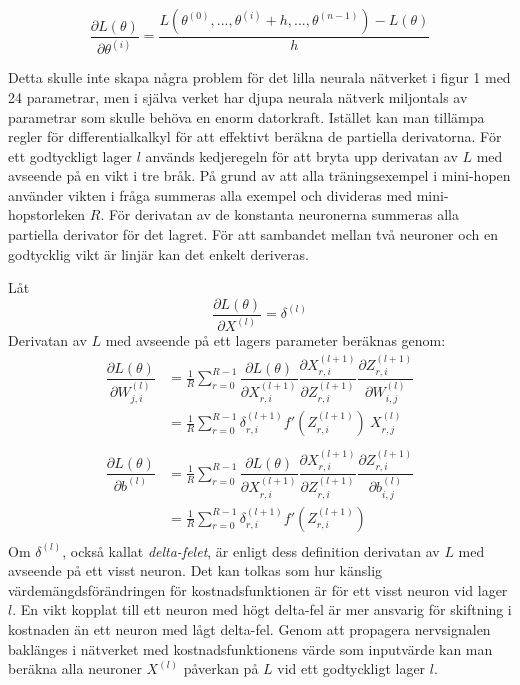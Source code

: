 \documentclass[a4paper,11pt,twoside]{article}
\newcommand*{\pd}[2]{\ensuremath{\dfrac{\partial #1}{\partial #2}}}
\newcommand*{\inpd}[2]{\ensuremath{\frac{\partial #1}{\partial #2}}}
\begin{document}
\begin{equation}
\pd{L(\theta)}{\theta^{(i)}} = \frac{L(\theta^{(0)},...,\theta^{(i)} + h, ..., \theta^{(n-1)})-L(\theta)}{h}
\end{equation}

Detta skulle inte skapa några problem för det lilla neurala nätverket i figur 1 med 24 parametrar, men i själva verket har djupa neurala nätverk miljontals av parametrar som skulle behöva en enorm datorkraft. Istället kan man tillämpa regler för differentialkalkyl för att effektivt beräkna de partiella derivatorna. För ett godtyckligt lager $l$ används kedjeregeln för att bryta upp derivatan av $L$ med avseende på en vikt i tre bråk. På grund av att alla träningsexempel i mini-hopen använder vikten i fråga summeras alla exempel och divideras med mini-hopstorleken $R$. För derivatan av de konstanta neuronerna summeras alla partiella derivator för det lagret. För att sambandet mellan två neuroner och en godtycklig vikt är linjär kan det enkelt deriveras. \cite{cs231n}

Låt
\begin{equation}
\inpd{L(\theta)}{X^{(l)}} = \delta^{(l)}
\end{equation}
Derivatan av $L$ med avseende på ett lagers parameter beräknas genom: \cite{cs231n}
\begin{equation}\label{dLdW_FCC}
\begin{split}
\pd{L(\theta)}{W^{(l)}_{j,i}} 
	& = \frac{1}{R}\sum^{R-1}_{r=0} \pd{L(\theta)}{X^{(l+1)}_{r,i}} \pd{X^{(l+1)}_{r,i}}{Z^{(l+1)}_{r,i}} \pd{Z^{(l+1)}_{r,i}}{W^{(l)}_{i,j}} \\
	& = \frac{1}{R}\sum^{R-1}_{r=0} \delta^{(l+1)}_{r,i} f'(Z^{(l+1)}_{r,i}) \ X^{(l)}_{r,j}\\
\end{split}
\end{equation}
\begin{equation}\label{dLdb_FCC}
\begin{split}
\pd{L(\theta)}{b^{(l)}} 
	& = \frac{1}{R}\sum^{R-1}_{r=0} \pd{L(\theta)}{X^{(l+1)}_{r,i}} \pd{X^{(l+1)}_{r,i}}{Z^{(l+1)}_{r,i}} \pd{Z^{(l+1)}_{r,i}}{b^{(l)}_{i,j}} \\
	& = \frac{1}{R}\sum^{R-1}_{r=0} \delta^{(l+1)}_{r,i} f'(Z^{(l+1)}_{r,i}) \\
\end{split}
\end{equation}
Om $\delta^{(l)}$, också kallat \textit{delta-felet}, är enligt dess definition derivatan av $L$ med avseende på ett visst neuron. Det kan tolkas som hur känslig värdemängdsförändringen för kostnadsfunktionen är för ett visst neuron vid lager $l$. En vikt kopplat till ett neuron med högt delta-fel är mer ansvarig för skiftning i kostnaden än ett neuron med lågt delta-fel. Genom att propagera nervsignalen baklänges i nätverket med kostnadsfunktionens värde som inputvärde kan man beräkna alla neuroner $X^{(l)}$ påverkan på $L$ vid ett godtyckligt lager $l$. \cite{cs231n}
\end{document}
